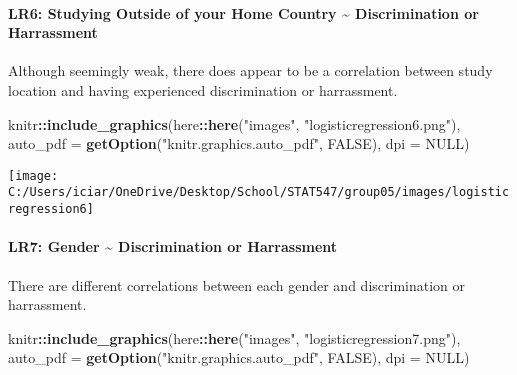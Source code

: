 \documentclass[
]{article}
\newenvironment{Shaded}{\begin{snugshade}}{\end{snugshade}}
\newcommand{\DataTypeTok}[1]{\textcolor[rgb]{0.13,0.29,0.53}{#1}}
\newcommand{\KeywordTok}[1]{\textcolor[rgb]{0.13,0.29,0.53}{\textbf{#1}}}
\newcommand{\NormalTok}[1]{#1}
\newcommand{\OperatorTok}[1]{\textcolor[rgb]{0.81,0.36,0.00}{\textbf{#1}}}
\newcommand{\OtherTok}[1]{\textcolor[rgb]{0.56,0.35,0.01}{#1}}
\newcommand{\StringTok}[1]{\textcolor[rgb]{0.31,0.60,0.02}{#1}}
\begin{document}
\hypertarget{lr6-studying-outside-of-your-home-country-discrimination-or-harrassment}{%
\paragraph{LR6: Studying Outside of your Home Country \textasciitilde{}
Discrimination or
Harrassment}\label{lr6-studying-outside-of-your-home-country-discrimination-or-harrassment}}

Although seemingly weak, there does appear to be a correlation between
study location and having experienced discrimination or harrassment.

\begin{Shaded}
\begin{Highlighting}[]
\NormalTok{knitr}\OperatorTok{::}\KeywordTok{include_graphics}\NormalTok{(here}\OperatorTok{::}\KeywordTok{here}\NormalTok{(}\StringTok{"images"}\NormalTok{, }\StringTok{"logisticregression6.png"}\NormalTok{), }\DataTypeTok{auto_pdf =} \KeywordTok{getOption}\NormalTok{(}\StringTok{"knitr.graphics.auto_pdf"}\NormalTok{, }\OtherTok{FALSE}\NormalTok{), }
    \DataTypeTok{dpi =} \OtherTok{NULL}\NormalTok{)}
\end{Highlighting}
\end{Shaded}

\texttt{[image: C:/Users/iciar/OneDrive/Desktop/School/STAT547/group05/images/logisticregression6]}

\hypertarget{lr7-gender-discrimination-or-harrassment}{%
\paragraph{LR7: Gender \textasciitilde{} Discrimination or
Harrassment}\label{lr7-gender-discrimination-or-harrassment}}

There are different correlations between each gender and discrimination
or harrassment.

\begin{Shaded}
\begin{Highlighting}[]
\NormalTok{knitr}\OperatorTok{::}\KeywordTok{include_graphics}\NormalTok{(here}\OperatorTok{::}\KeywordTok{here}\NormalTok{(}\StringTok{"images"}\NormalTok{, }\StringTok{"logisticregression7.png"}\NormalTok{), }\DataTypeTok{auto_pdf =} \KeywordTok{getOption}\NormalTok{(}\StringTok{"knitr.graphics.auto_pdf"}\NormalTok{, }\OtherTok{FALSE}\NormalTok{), }
    \DataTypeTok{dpi =} \OtherTok{NULL}\NormalTok{)}
\end{Highlighting}
\end{Shaded}
\end{document}
